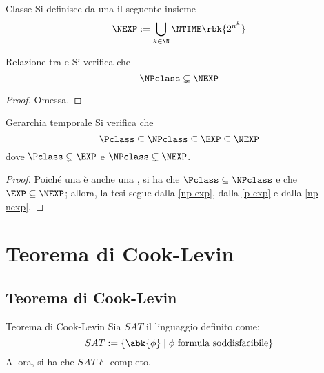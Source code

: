 \documentclass[a4paper, 12pt]{report}
\begin{document}
    \begin{frameddefn}{Classe \NEXP}
        Si definisce  da una \NTM il seguente insieme $$\NEXP := \bigcup_{k \in \N}{\NTIME \rbk{2^{n^k}}}$$
    \end{frameddefn}

    \begin{framedprop}[label={np nexp}]{Relazione tra \NPclass e \NEXP}
        Si verifica che $$\NPclass \subsetneq \NEXP$$
    \end{framedprop}

    \begin{proof}
        Omessa.
    \end{proof}

    \begin{framedcor}[label={time hier}]{Gerarchia temporale}
        Si verifica che $$\Pclass \subseteq \NPclass \subseteq \EXP \subseteq \NEXP$$ dove $\Pclass \subsetneq \EXP$ e $\NPclass \subsetneq \NEXP$.
    \end{framedcor}

    \begin{proof}
        Poiché una \TM è anche una \NTM, si ha che $\Pclass \subseteq \NPclass$ e che $\EXP \subseteq \NEXP$; allora, la tesi segue dalla \cref{np exp}, dalla \cref{p exp} e dalla \cref{np nexp}.
    \end{proof}

    \section{Teorema di Cook-Levin}

    \subsection{Teorema di Cook-Levin}

    \begin{framedthm}{Teorema di Cook-Levin}
        Sia $SAT$ il linguaggio definito come: $$SAT := \{\abk{\phi} \mid \phi \ \textrm{formula soddisfacibile}\}$$ Allora, si ha che $SAT$ è \NPclass-completo.
    \end{framedthm}
\end{document}
